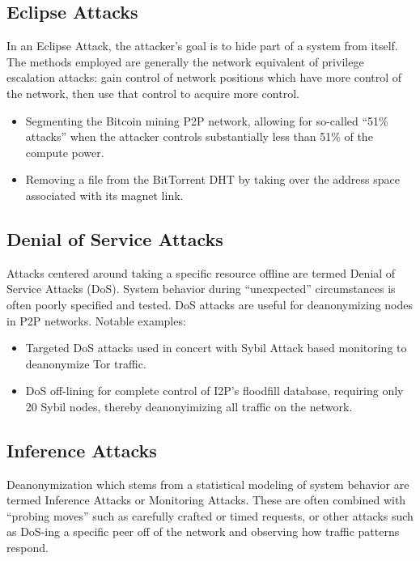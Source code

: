 \subsection{Eclipse Attacks}

In an Eclipse Attack, the attacker's goal is to hide part of a system from itself. The methods employed are generally the network equivalent of privilege escalation attacks: gain control of network positions which have more control of the network, then use that control to acquire more control.

\begin{itemize}
\item Segmenting the Bitcoin mining P2P network, allowing for so-called “51\% attacks” when the attacker controls substantially less than 51\% of the compute power\cite{bitcoinEclipse}.
\item Removing a file from the BitTorrent DHT by taking over the address space associated with its magnet link\cite{bittorrentSybilAttacks}.
\end{itemize}

\subsection{Denial of Service Attacks}

Attacks centered around taking a specific resource offline are termed Denial of Service Attacks (DoS). System behavior during “unexpected” circumstances is often poorly specified and tested. DoS attacks are useful for deanonymizing nodes in P2P networks. Notable examples:

\begin{itemize}
\item Targeted DoS attacks used in concert with Sybil Attack based monitoring to deanonymize Tor traffic\cite{DOSvsSec}.
\item DoS off-lining for complete control of I2P’s floodfill database, requiring only 20 Sybil nodes, thereby deanonyimizing all traffic on the network\cite{I2P-vigna}.
\end{itemize}

\subsection{Inference Attacks}
\label{inference-attacks}

Deanonymization which stems from a statistical modeling of system behavior are termed Inference Attacks or Monitoring Attacks. These are often combined with “probing moves” such as carefully crafted or timed requests, or other attacks such as DoS-ing a specific peer off of the network and observing how traffic patterns respond.


